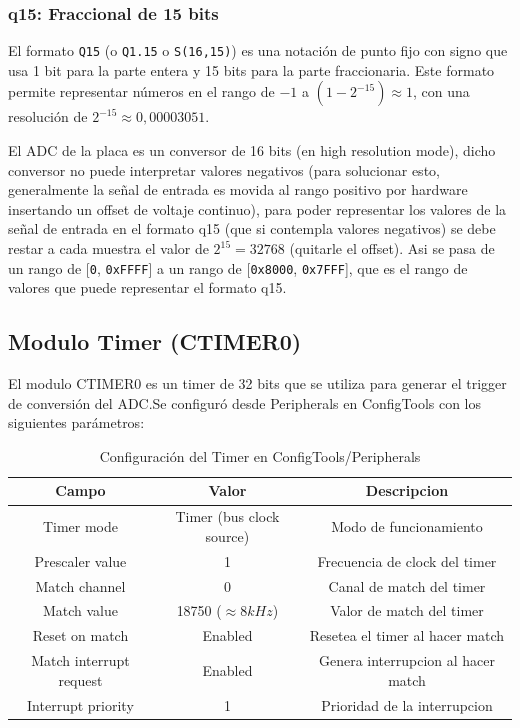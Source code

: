 \documentclass[11pt,a4paper]{article}
\begin{document}
\subsubsection{q15: Fraccional de 15 bits}

El formato \texttt{Q15} (o \texttt{Q1.15} o \texttt{S(16,15)}) es una notación
de punto fijo con signo que usa 1 bit para la parte entera y 15 bits para la
parte fraccionaria. Este formato permite representar números en el rango de
$-1$ a $(1 - 2^{-15}) \approx 1$, con una resolución de $2^{-15} \approx
    0{,}00003051$.

El ADC de la placa es un conversor de 16 bits (en high resolution mode), dicho
conversor no puede interpretar valores negativos (para solucionar esto,
generalmente la señal de entrada es movida al rango positivo por hardware
insertando un offset de voltaje continuo), para poder representar los valores
de la señal de entrada en el formato q15 (que si contempla valores negativos)
se debe restar a cada muestra el valor de $2^{15} = 32768$ (quitarle el
offset). Asi se pasa de un rango de [\texttt{0}, \texttt{0{x}FFFF}] a un rango
de [\texttt{0{x}8000}, \texttt{0{x}7FFF}], que es el rango de valores que puede
representar el formato q15.

\subsection{Modulo Timer (CTIMER0)}

El modulo CTIMER0 es un timer de 32 bits que se utiliza para generar el trigger
de conversión del ADC.\@ Se configuró desde Peripherals en ConfigTools con los
siguientes parámetros:

\begin{table}[H]
    \centering
    \begin{tabular}{|c|c|c|}
        \hline
        \textbf{Campo}          & \textbf{Valor}           & \textbf{Descripcion}               \\
        \hline
        Timer mode              & Timer (bus clock source) & Modo de funcionamiento             \\
        Prescaler value         & 1                        & Frecuencia de clock del timer      \\
        Match channel           & 0                        & Canal de match del timer           \\
        Match value             & 18750 ($\approx 8kHz$)   & Valor de match del timer           \\
        Reset on match          & Enabled                  & Resetea el timer al hacer match    \\
        Match interrupt request & Enabled                  & Genera interrupcion al hacer match \\
        Interrupt priority      & 1                        & Prioridad de la interrupcion       \\
        \hline
    \end{tabular}
    \caption{Configuración del Timer en ConfigTools/Peripherals}
\end{table}
\end{document}
